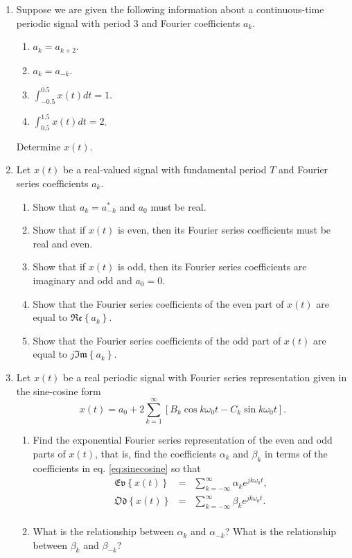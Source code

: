 \documentclass[11pt]{article}
\begin{document}
\begin{enumerate}
\item Suppose we are given the following information about a continuous-time periodic signal with period 3 and Fourier coefficients $a_k$.
    \begin{enumerate}
      \item $a_k = a_{k+2}$.
      \item $a_k = a_{-k}$.
      \item $\int_{-0.5}^{0.5}x(t)dt = 1$.
      \item $\int_{0.5}^{1.5}x(t)dt = 2$.
    \end{enumerate}
    Determine $x(t)$.

\item Let $x(t)$ be a real-valued signal with fundamental period $T$ and Fourier series coefficients $a_k$.
    \begin{enumerate}
      \item Show that $a_k = a^\ast_{-k}$ and $a_0$ must be real.
      \item Show that if $x(t)$ is even, then its Fourier series coefficients must be real and even.
      \item Show that if $x(t)$ is odd, then its Fourier series coefficients are imaginary and odd and $a_0 = 0$.
      \item Show that the Fourier series coefficients of the even part of $x(t)$ are equal to $\mathfrak{Re}\left\{a_k\right\}$.
      \item Show that the Fourier series coefficients of the odd part of $x(t)$ are equal to $j\mathfrak{Im}\left\{a_k\right\}$.
    \end{enumerate}

\item Let $x(t)$ be a real periodic signal with Fourier series representation given in the sine-cosine form
    \begin{equation}\label{eq:sinecosine}
        x(t) = a_0 + 2\sum_{k=1}^{\infty}[B_k \cos k\omega_0 t - C_k \sin k\omega_0 t].
    \end{equation}
    \begin{enumerate}
      \item Find the exponential Fourier series representation of the even and odd parts of $x(t)$, that is, find the coefficients $\alpha_k$ and $\beta_k$ in terms of the coefficients in eq. \ref{eq:sinecosine} so that
          \begin{eqnarray*}
            \mathfrak{Ev}\left\{x(t)\right\} &=& \sum_{k=-\infty}^{\infty} \alpha_k e^{jk\omega_0 t},\\
            \mathfrak{Od}\left\{x(t)\right\} &=&  \sum_{k=-\infty}^{\infty} \beta_k e^{jk\omega_0 t}.\\
          \end{eqnarray*}
      \item What is the relationship between $\alpha_k$ and $\alpha_{-k}$? What is the relationship between $\beta_k$ and $\beta_{-k}$?
    \end{enumerate}
\end{enumerate}
\end{document}
